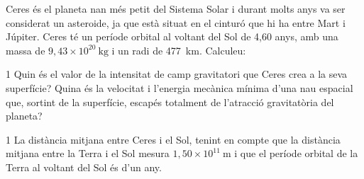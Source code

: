 Ceres és el planeta nan més petit del Sistema Solar i durant molts anys va ser considerat un asteroide, ja que està situat en el cinturó que hi ha entre Mart i Júpiter. Ceres té un període orbital al voltant del Sol de 4,60 anys, amb una massa de $9,43\times 10^{20}\ \mathrm{kg}$ i un radi de 477~km. Calculeu:


\begin{apartat}{1}
Quin és el valor de la intensitat de camp gravitatori que Ceres crea a la seva superfície? Quina és la velocitat i l'energia mecànica mínima d'una nau espacial que, sortint de la superfície, escapés totalment de l'atracció gravitatòria del planeta?
\end{apartat}

\begin{apartat}{1}
La distància mitjana entre Ceres i el Sol, tenint en compte que la distància mitjana entre la Terra i el Sol mesura $1,50\times 10^{11}\ \mathrm{m}$ i que el període orbital de la Terra al voltant del Sol és d'un any.
\end{apartat}

